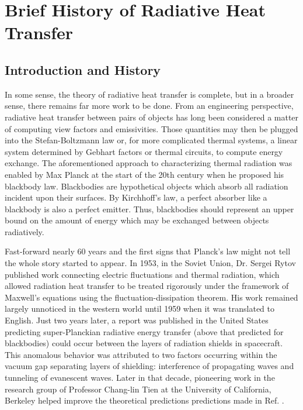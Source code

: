 \chapter[Brief History of Radiative Heat Transfer][Brief History of Radiative Heat Transfer]{Brief History of Radiative Heat Transfer}
%
\section{Introduction and History}
%
In some sense, the theory of radiative heat transfer is complete, but in a broader sense, there remains far more work to be done. From an engineering perspective, radiative heat transfer between pairs of objects has long been considered a matter of computing view factors and emissivities. Those quantities may then be plugged into the Stefan-Boltzmann law or, for more complicated thermal systems, a linear system determined by Gebhart factors or thermal circuits, to compute energy exchange.\cite{Howell2011} The aforementioned approach to characterizing thermal radiation was enabled by Max Planck at the start of the 20th century when he proposed his blackbody law.\cite{Planck1959} Blackbodies are hypothetical objects which absorb all radiation incident upon their surfaces. By Kirchhoff's law, a perfect absorber like a blackbody is also a perfect emitter.\cite{Kirchhoff1860} Thus, blackbodies should represent an upper bound on the amount of energy which may be exchanged between objects radiatively.

Fast-forward nearly 60 years and the first signs that Planck's law might not tell the whole story started to appear. In 1953, in the Soviet Union, Dr. Sergei Rytov published work connecting electric fluctuations and thermal radiation, which allowed radiation heat transfer to be treated rigorously under the framework of Maxwell's equations using the fluctuation-dissipation theorem.\cite{Rytov1953} His work remained largely unnoticed in the western world until 1959 when it was translated to English.\cite{Rytov1959} Just two years later, a report was published in the United States predicting super-Planckian radiative energy transfer (above that predicted for blackbodies) could occur between the layers of radiation shields in spacecraft.\cite{Emslie1961} This anomalous behavior was attributed to two factors occurring within the vacuum gap separating layers of shielding: interference of propagating waves and tunneling of evanescent waves. Later in that decade, pioneering work\cite{Cravalho1967, Boehm1970, Domoto1970} in the research group of Professor Chang-lin Tien at the University of California, Berkeley helped improve the theoretical predictions predictions made in Ref. .

